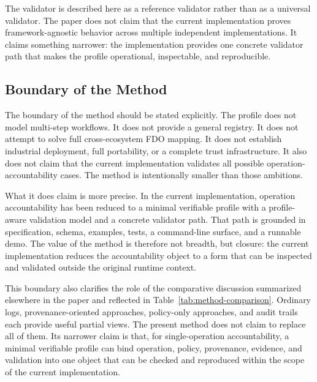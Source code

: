 

The validator is described here as a reference validator rather than as a universal validator. The paper does not claim that the current implementation proves framework-agnostic behavior across multiple independent implementations. It claims something narrower: the implementation provides one concrete validator path that makes the profile operational, inspectable, and reproducible.

\subsection{Boundary of the Method}

The boundary of the method should be stated explicitly. The profile does not model multi-step workflows. It does not provide a general registry. It does not attempt to solve full cross-ecosystem FDO mapping. It does not establish industrial deployment, full portability, or a complete trust infrastructure. It also does not claim that the current implementation validates all possible operation-accountability cases. The method is intentionally smaller than those ambitions.

What it does claim is more precise. In the current implementation, operation accountability has been reduced to a minimal verifiable profile with a profile-aware validation model and a concrete validator path. That path is grounded in specification, schema, examples, tests, a command-line surface, and a runnable demo. The value of the method is therefore not breadth, but closure: the current implementation reduces the accountability object to a form that can be inspected and validated outside the original runtime context.

This boundary also clarifies the role of the comparative discussion summarized elsewhere in the paper and reflected in Table~\ref{tab:method-comparison}. Ordinary logs, provenance-oriented approaches, policy-only approaches, and audit trails each provide useful partial views. The present method does not claim to replace all of them. Its narrower claim is that, for single-operation accountability, a minimal verifiable profile can bind operation, policy, provenance, evidence, and validation into one object that can be checked and reproduced within the scope of the current implementation.
